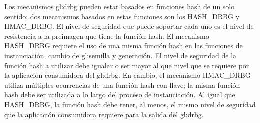 %
%

Los mecanismos \gls{gl:drbg} pueden estar basados en funciones hash de un
solo sentido; dos mecanismos basados en estas funciones son los HASH\_DRBG 
y HMAC\_DRBG. El nivel de seguridad que puede soportar cada uno es el nivel de
resistencia a la preimagen que tiene la función hash.
El mecanismo HASH\_DRBG requiere el uso de una misma función hash en las 
funciones de instanciación, cambio de \gls{gl:semilla} y generación. El nivel
de seguridad de la función hash a utilizar debe igualar o ser mayor al que
nivel que se requiere por la aplicación consumidora del \gls{gl:drbg}. En
cambio, el mecanismo HMAC\_DRBG utiliza múltiples ocurrencias de una función
hash con llave; la misma función hash debe ser utilizada a lo largo del proceso
de instanciación. Al igual que HASH\_DRBG, la función hash debe tener, al menos,
el mismo nivel de seguridad que la aplicación consumidora requiere para la 
salida del \gls{gl:drbg}.